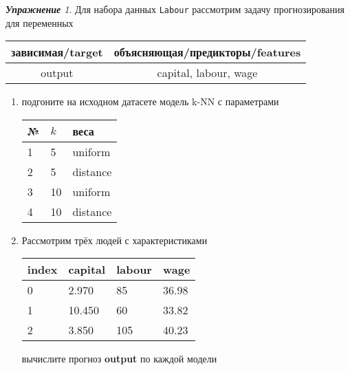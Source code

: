 \documentclass[a4,12pt]{article}
\theoremstyle{remark}
\newtheorem{exercise}{\textbf{Упражнение}}[section]
\begin{document}
\begin{exercise}
Для набора данных \texttt{Labour} рассмотрим задачу прогнозирования
для переменных
\begin{center}
	\begin{tabular}{|c|c|}\hline
		зависимая/target & объясняющая/предикторы/features \\ \hline
		output & capital, labour, wage \\ \hline
	\end{tabular}
\end{center}
\begin{enumerate}
	\item подгоните на исходном датасете модель k-NN с параметрами
	\begin{center}
		\begin{tabular}{|l|l|l|}\hline
		№ & \(k\) & веса \\ \hline
		1 & 5 & uniform \\
		2 & 5 & distance \\
		3 & 10 & uniform \\
		4 & 10 & distance \\ \hline
		\end{tabular}
	\end{center}
	\item Рассмотрим трёх людей с характеристиками
	\begin{center}
		\begin{tabular}{|l||l|l|l|}\hline
			index & capital & labour & wage \\ \hline\hline
			0 & 2.970 & 85 & 36.98\\
			1 & 10.450 & 60 & 33.82  \\
			2 & 3.850 & 105 & 40.23\\ \hline
		\end{tabular}
	\end{center}
	вычислите прогноз \textbf{output} по каждой модели
\end{enumerate}
\end{exercise}
\end{document}
